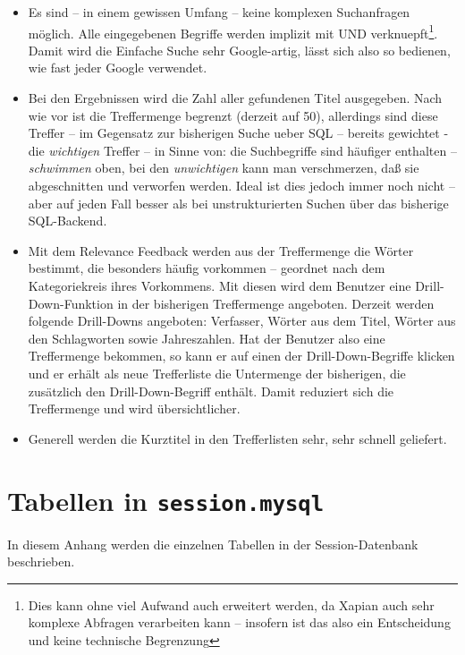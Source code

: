 \documentclass[11pt, twoside, a4paper, BCOR8mm, DIV12, bibtotoc,idxtotoc]{scrbook}
\begin{document}
\begin{itemize}
\item Es sind -- in einem gewissen Umfang -- keine komplexen
  Suchanfragen möglich. Alle ein\-ge\-ge\-be\-nen Begriffe werden implizit mit
  UND verknuepft\footnote{Dies kann ohne viel Aufwand auch erweitert
    werden, da Xapian auch sehr komplexe Abfragen verarbeiten kann --
    insofern ist das also ein Entscheidung und keine technische
    Begrenzung}. Damit wird die Einfache Suche sehr Google-artig,
  lässt sich also so bedienen, wie fast jeder Google verwendet.
\item Bei den Ergebnissen wird die Zahl aller gefundenen Titel
  ausgegeben. Nach wie vor ist die Treffermenge begrenzt (derzeit auf
  50), allerdings sind diese Treffer -- im Gegen\-satz zur bisherigen
  Suche ueber SQL -- bereits gewichtet - die \emph{wichtigen} Treffer
  -- in Sinne von: die Suchbegriffe sind häufiger enthalten --
  \emph{schwimmen} oben, bei den \emph{unwichtigen} kann man
  verschmerzen, daß sie abgeschnitten und verworfen werden. Ideal ist
  dies jedoch immer noch nicht -- aber auf jeden Fall besser als bei
  unstrukturierten Suchen über das bisherige SQL-Backend.
\item Mit dem Relevance Feedback werden aus der Treffermenge die Wörter
bestimmt, die beson\-ders häufig vorkommen -- geordnet nach dem Kategoriekreis
ihres Vorkommens. Mit diesen wird dem Benutzer eine Drill-Down-Funktion in
der bisherigen Treffermenge angeboten. Derzeit werden folgende Drill-Downs
angeboten: Verfasser, Wörter aus dem Titel, Wörter aus den Schlagworten
sowie Jahreszahlen. Hat der Benutzer also eine Treffermenge be\-kom\-men, so
kann er auf einen der Drill-Down-Begriffe klicken und er erhält als neue
Trefferliste die Untermenge der bisherigen, die zusätzlich den
Drill-Down-Begriff enthält. Damit reduziert sich die Treffermenge und wird
übersichtlicher.
\item Generell werden die Kurztitel in den Trefferlisten sehr, sehr schnell
geliefert.
\end{itemize}



\appendix


\chapter{Tabellen in \texttt{session.mysql}}

In diesem Anhang werden die einzelnen Tabellen in der
Session-Datenbank beschrieben.
\end{document}
